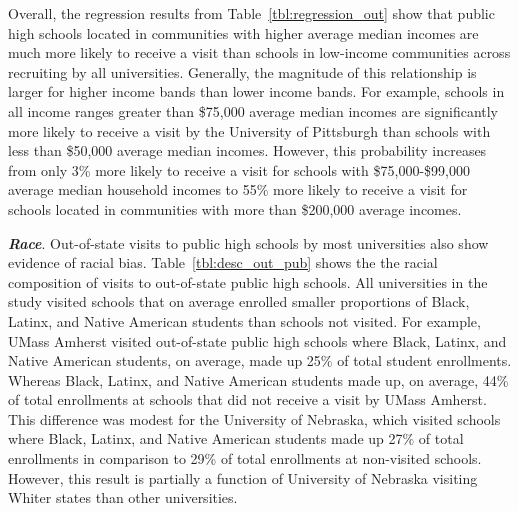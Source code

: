 \documentclass[twoside]{article}
\begin{document}
Overall, the regression results from Table~\ref{tbl:regression_out} show that public high schools located in communities with higher average median incomes are much more likely to receive a visit than schools in low-income communities across recruiting by all universities. Generally, the magnitude of this relationship is larger for higher income bands than lower income bands. For example, schools in all income ranges greater than \$75,000 average median incomes are significantly more likely to receive a visit by the University of Pittsburgh than schools with less than \$50,000 average median incomes. However, this probability increases from only 3\% more likely to receive a visit for schools with \$75,000-\$99,000 average median household incomes to 55\% more likely to receive a visit for schools located in communities with more than \$200,000 average incomes.


\textbf{\textit{Race}}. Out-of-state visits to public high schools by most universities also show evidence of racial bias. Table~\ref{tbl:desc_out_pub} shows the the racial composition of visits to out-of-state public high schools. All universities in the study visited schools that on average enrolled smaller proportions of Black, Latinx, and Native American students than schools not visited. For example, UMass Amherst visited out-of-state public high schools where Black, Latinx, and Native American students, on average, made up 25\% of total student enrollments. Whereas Black, Latinx, and Native American students made up, on average, 44\% of total enrollments at schools that did not receive a visit by UMass Amherst. This difference was modest for the University of Nebraska, which visited schools where Black, Latinx, and Native American students made up 27\% of total enrollments in comparison to 29\% of total enrollments at non-visited schools. However, this result is partially a function of University of Nebraska visiting Whiter states than other universities.

\end{document}
